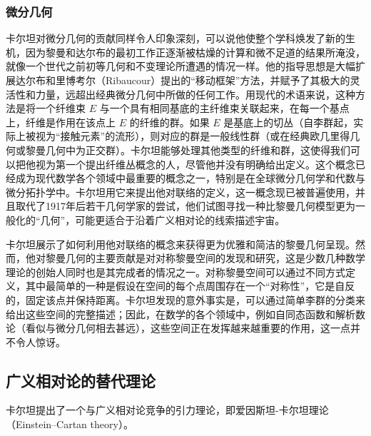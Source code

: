 \subsubsection{微分几何}  
卡尔坦对微分几何的贡献同样令人印象深刻，可以说他使整个学科焕发了新的生机，因为黎曼和达尔布的最初工作正逐渐被枯燥的计算和微不足道的结果所淹没，就像一个世代之前初等几何和不变理论所遭遇的情况一样。他的指导思想是大幅扩展达尔布和里博考尔（Ribaucour）提出的“移动框架”方法，并赋予了其极大的灵活性和力量，远超出经典微分几何中所做的任何工作。用现代的术语来说，这种方法是将一个纤维束 \( E \) 与一个具有相同基底的主纤维束关联起来，在每一个基点上，纤维是作用在该点上 \( E \) 的纤维的群。如果 \( E \) 是基底上的切丛（自李群起，实际上被视为“接触元素”的流形），则对应的群是一般线性群（或在经典欧几里得几何或黎曼几何中为正交群）。卡尔坦能够处理其他类型的纤维和群，这使得我们可以把他视为第一个提出纤维丛概念的人，尽管他并没有明确给出定义。这个概念已经成为现代数学各个领域中最重要的概念之一，特别是在全球微分几何学和代数与微分拓扑学中。卡尔坦用它来提出他对联络的定义，这一概念现已被普遍使用，并且取代了1917年后若干几何学家的尝试，他们试图寻找一种比黎曼几何模型更为一般化的“几何”，可能更适合于沿着广义相对论的线索描述宇宙。

卡尔坦展示了如何利用他对联络的概念来获得更为优雅和简洁的黎曼几何呈现。然而，他对黎曼几何的主要贡献是对对称黎曼空间的发现和研究，这是少数几种数学理论的创始人同时也是其完成者的情况之一。对称黎曼空间可以通过不同方式定义，其中最简单的一种是假设在空间的每个点周围存在一个“对称性”，它是自反的，固定该点并保持距离。卡尔坦发现的意外事实是，可以通过简单李群的分类来给出这些空间的完整描述；因此，在数学的各个领域中，例如自同态函数和解析数论（看似与微分几何相去甚远），这些空间正在发挥越来越重要的作用，这一点并不令人惊讶。
\subsection{广义相对论的替代理论}  
卡尔坦提出了一个与广义相对论竞争的引力理论，即爱因斯坦-卡尔坦理论（Einstein–Cartan theory）。
